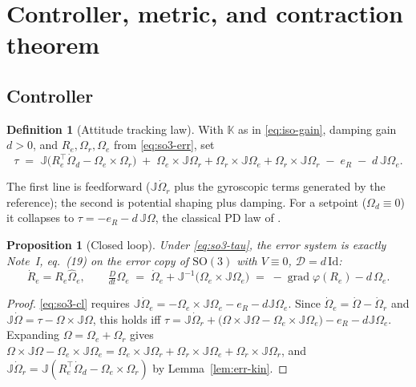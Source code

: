 \documentclass[11pt,a4paper]{article}
\newcommand{\Jm}{\mathbb{J}}
\newcommand{\Km}{\mathbb{K}}
\newcommand{\grad}{\operatorname{grad}}
\newcommand{\Damp}{\mathcal{D}}
\newcommand{\id}{\mathrm{Id}}
\newcommand{\Dt}{\tfrac{D}{dt}}
\newcommand{\SO}{\mathrm{SO}(3)}
\newcommand{\Ome}{\Omega_{\!e}}
\newcommand{\Omr}{\Omega_{\!r}}
\newcommand{\eR}{e_{R}}
\theoremstyle{plain}
\newtheorem{proposition}[theorem]{Proposition}
\theoremstyle{definition}
\newtheorem{definition}[theorem]{Definition}
\theoremstyle{remark}
\begin{document}
\section{Controller, metric, and contraction theorem}
\label{sec:so3-main}

\subsection{Controller}

\begin{definition}[Attitude tracking law]
\label{def:so3-ctrl}
With $\Km$ as in \eqref{eq:iso-gain}, damping gain $d>0$, and $R_e,\Omr,\Ome$ from
\eqref{eq:so3-err}, set
\begin{equation}
  \boxed{\;
  \tau \;=\; \Jm\big(R_e^{\top}\dot\Omega_d - \Ome\times\Omr\big)
   \;+\; \Ome\times\Jm\Omr + \Omr\times\Jm\Ome + \Omr\times\Jm\Omr
   \;-\; \eR \;-\; d\,\Jm\Ome .
  \;}
  \label{eq:so3-tau}
\end{equation}
\end{definition}

The first line is feedforward ($\Jm\dot\Omr$ plus the gyroscopic terms generated by
the reference); the second is potential shaping plus damping. For a setpoint
($\Omega_d\equiv0$) it collapses to $\tau = -\eR - d\,\Jm\Omega$, the classical PD
law of \cite[\S11.1]{BL04}.

\begin{proposition}[Closed loop]
\label{prop:so3-cl}
Under \eqref{eq:so3-tau}, the error system is exactly Note~I, eq.~(19) on the error
copy of $\SO$ with $V\equiv0$, $\Damp = d\,\id$:
\begin{equation}
  \dot R_e = R_e\hat\Ome,
  \qquad
  \Dt\Ome \;=\; \dot\Ome + \Jm^{-1}\big(\Ome\times\Jm\Ome\big)
             \;=\; -\grad\varphi(R_e) - d\,\Ome .
  \label{eq:so3-cl}
\end{equation}
\end{proposition}

\begin{proof}
\eqref{eq:so3-cl} requires
$\Jm\dot\Ome = -\Ome\times\Jm\Ome - \eR - d\Jm\Ome$. Since
$\dot\Ome = \dot\Omega - \dot\Omr$ and $\Jm\dot\Omega = \tau - \Omega\times\Jm\Omega$,
this holds iff
$\tau = \Jm\dot\Omr + \big(\Omega\times\Jm\Omega - \Ome\times\Jm\Ome\big) - \eR - d\Jm\Ome$.
Expanding $\Omega = \Ome+\Omr$ gives
$\Omega\times\Jm\Omega - \Ome\times\Jm\Ome = \Ome\times\Jm\Omr + \Omr\times\Jm\Ome + \Omr\times\Jm\Omr$,
and $\Jm\dot\Omr = \Jm(R_e^{\top}\dot\Omega_d - \Ome\times\Omr)$ by
Lemma~\ref{lem:err-kin}.
\end{proof}
\end{document}
